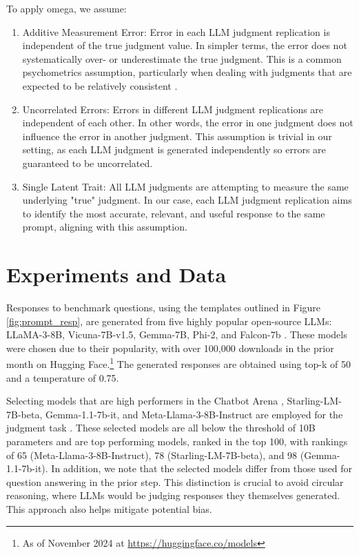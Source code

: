 \documentclass[11pt]{article}
\begin{document}
To apply omega, we assume:

\begin{enumerate}
    \item Additive Measurement Error: Error in each LLM judgment replication is independent of the true judgment value. In simpler terms, the error does not systematically over- or underestimate the true judgment. This is a common psychometrics assumption, particularly when dealing with judgments that are expected to be relatively consistent \citep{alagumalai2005classical, wadkar2016assessing, liu2010impact}.
    \item Uncorrelated Errors: Errors in different LLM judgment replications are independent of each other. In other words, the error in one judgment does not influence the error in another judgment. This assumption is trivial in our setting, as each LLM judgment is generated independently so errors are guaranteed to be uncorrelated.
    \item Single Latent Trait: All LLM judgments are attempting to measure the same underlying "true" judgment. In our case, each LLM judgment replication aims to identify the most accurate, relevant, and useful response to the same prompt, aligning with this assumption.
\end{enumerate}


\section{Experiments and Data}
\label{sec:experiments}

Responses to benchmark questions, using the templates outlined in Figure \ref{fig:prompt_resp}, are generated from five highly popular open-source LLMs: LLaMA-3-8B, Vicuna-7B-v1.5, Gemma-7B, Phi-2, and Falcon-7b \citep{dubey2024llama, chiang2023vicuna, team2024gemma, javaheripi2023phi, falcon40b}. These models were chosen due to their popularity, with over 100,000 downloads in the prior month on Hugging Face.\footnote{As of November 2024 at \url{https://huggingface.co/models}} %
The generated responses are obtained using top-k of 50 and a temperature of 0.75.


Selecting models that are high performers in the Chatbot Arena \citep{chiang2024chatbot}, Starling-LM-7B-beta, Gemma-1.1-7b-it, and Meta-Llama-3-8B-Instruct are employed for the judgment task \citet{starling2023, gemma2024, llama3modelcard}. These selected models are all below the threshold of 10B parameters and are top performing models, ranked in the top 100, with rankings of 65 (Meta-Llama-3-8B-Instruct), 78 (Starling-LM-7B-beta), and 98 (Gemma-1.1-7b-it). In addition, we note that the selected models differ from those used for question answering in the prior step. This distinction is crucial to avoid circular reasoning, where LLMs would be judging responses they themselves generated. This approach also helps mitigate potential bias.
\end{document}
